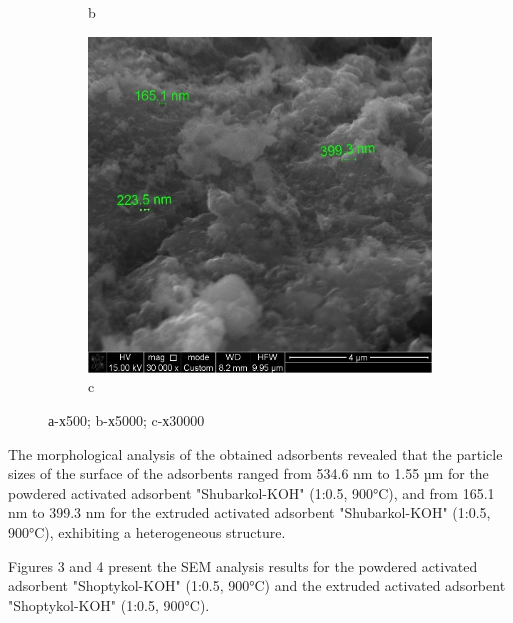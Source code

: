 \begin{figure}[H]
\begin{subfigure}[b]{0.32\textwidth}
        \caption*{b}
    \end{subfigure}
    \hfill
    \begin{subfigure}[b]{0.32\textwidth}
        \centering
        \includegraphics[width=\textwidth,height=\textwidth]{media/chem2/image14}
        \caption*{c}
    \end{subfigure}
    \caption*{Fig.2 - SEM results for the extruded activated adsorbent "Shubarkol-KOH" (1:0.5, 900°C):}
    \caption*{а-х500; b-х5000; c-х30000}
\end{figure}

\begin{multicols}{2}
The morphological analysis of the obtained adsorbents revealed that the
particle sizes of the surface of the adsorbents ranged from 534.6 nm to
1.55 µm for the powdered activated adsorbent "Shubarkol-KOH" (1:0.5,
900°C), and from 165.1 nm to 399.3 nm for the extruded activated
adsorbent "Shubarkol-KOH" (1:0.5, 900°C), exhibiting a heterogeneous
structure.

Figures 3 and 4 present the SEM analysis results for the powdered
activated adsorbent "Shoptykol-KOH" (1:0.5, 900°C) and the extruded
activated adsorbent "Shoptykol-KOH" (1:0.5, 900°C).
\end{multicols}

